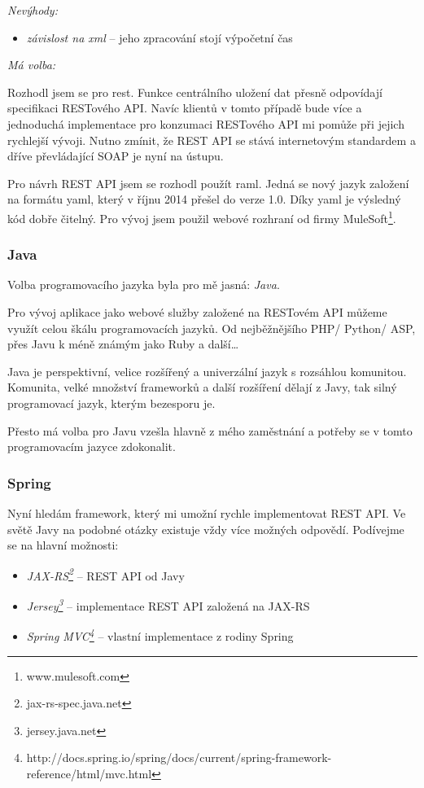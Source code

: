 \documentclass[thesis=B,czech]{FITthesis}[2012/06/26]
\begin{document}
\textit{Nevýhody:}
\begin{itemize}[nosep]
	\item \textit{závislost na \acrshort{xml}} -- jeho zpracování stojí výpočetní čas
\end{itemize}
\vspace*{1\baselineskip}
\textit{Má volba:}

Rozhodl jsem se pro \acrshort{rest}. Funkce centrálního uložení dat přesně odpovídají specifikaci RESTového API. Navíc klientů v tomto případě bude více a jednoduchá implementace pro konzumaci RESTového API mi pomůže při jejich rychlejší vývoji.
Nutno zmínit, že REST API se stává internetovým standardem a dříve převládající SOAP je nyní na ústupu.

Pro návrh REST API jsem se rozhodl použít \acrshort{raml}. Jedná se nový jazyk založení na formátu \acrshort{yaml}, který v říjnu 2014 přešel do verze 1.0. Díky \acrshort{yaml} je výsledný kód dobře čitelný. Pro vývoj jsem použil webové rozhraní od firmy MuleSoft\footnote{www.mulesoft.com}.  
\vspace*{1\baselineskip}

\subsubsection{Java}

Volba programovacího jazyka byla pro mě jasná: \textit{Java}.

Pro vývoj aplikace jako webové služby založené na RESTovém API můžeme využít celou škálu programovacích jazyků. Od nejběžnějšího PHP/ Python/ ASP, přes Javu k méně známým jako Ruby a další\dots

Java je perspektivní, velice rozšířený a univerzální jazyk s rozsáhlou komunitou. Komunita, velké množství frameworků a další rozšíření dělají z Javy, tak silný programovací jazyk, kterým bezesporu je.  

Přesto má volba pro Javu vzešla hlavně z mého zaměstnání a potřeby se v tomto programovacím jazyce zdokonalit. 

\subsubsection{Spring}

Nyní hledám framework, který mi umožní rychle implementovat REST API. Ve světě Javy na podobné otázky existuje vždy více možných odpovědí. 
Podívejme se na hlavní možnosti:
\begin{itemize}
	\item \textit{JAX-RS\footnote{jax-rs-spec.java.net}} -- REST API od Javy
    \item \textit{Jersey\footnote{jersey.java.net}} -- implementace REST API založená na JAX-RS
    \item \textit{Spring MVC\footnote{http://docs.spring.io/spring/docs/current/spring-framework-reference/html/mvc.html}} -- vlastní implementace z rodiny Spring
\end{itemize}
\end{document}
